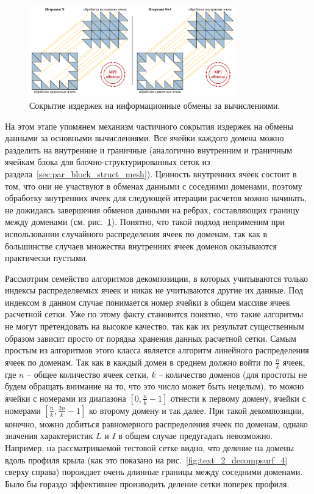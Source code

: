\begin{figure}[ht]
\centering
\includegraphics[width=0.8\textwidth]{fig/par_mpi_border_inner.pdf}
\singlespacing
{}\caption{Сокрытие издержек на информационные обмены за вычислениями.}
\label{fig:text_2_decompsurf_wing_border_inner}
\end{figure}

На этом этапе упомянем механизм частичного сокрытия издержек на обмены данными за основными вычислениями.
Все ячейки каждого домена можно разделить на внутренние и граничные (аналогично внутренним и граничным ячейкам блока для блочно-структурированных сеток из раздела~\ref{sec:par_block_struct_mesh}).
Ценность внутренних ячеек состоит в том, что они не участвуют в обменах данными с соседними доменами, поэтому обработку внутренних ячеек для следующей итерации расчетов можно начинать, не дожидаясь завершения обменов данными на ребрах, составляющих границу между доменами (см. рис.~\ref{fig:text_2_decompsurf_wing_border_inner}).
Понятно, что такой подход неприменим при использовании случайного распределения ячеек по доменам, так как в большинстве случаев множества внутренних ячеек доменов оказываются практически пустыми.

Рассмотрим семейство алгоритмов декомпозиции, в которых учитываются только индексы распределяемых ячеек и никак не учитываются другие их данные.
Под индексом в данном случае понимается номер ячейки в общем массиве ячеек расчетной сетки.
Уже по этому факту становится понятно, что такие алгоритмы не могут претендовать на высокое качество, так как их результат существенным образом зависит просто от порядка хранения данных расчетной сетки.
Самым простым из алгоритмов этого класса является алгоритм линейного распределения ячеек по доменам.
Так как в каждый домен в среднем должно войти по $\frac{n}{k}$ ячеек, где $n$ -- общее количество ячеек сетки, $k$ -- количество доменов (для простоты не будем обращать внимание на то, что это число может быть нецелым), то можно ячейки с номерами из диапазона $[0, \frac{n}{k} - 1]$ отнести к первому домену, ячейки с номерами $[\frac{n}{k}, \frac{2n}{k} - 1]$ ко второму домену и так далее.
При такой декомпозиции, конечно, можно добиться равномерного распределения ячеек по доменам, однако значения характеристик $L$ и $I$ в общем случае предугадать невозможно.
Например, на рассматриваемой тестовой сетке видно, что деление на домены вдоль профиля крыла (как это показано на рис.~\ref{fig:text_2_decompsurf_4} сверху справа) порождает очень длинные границы между соседними доменами.
Было бы гораздо эффективнее производить деление сетки поперек профиля.

